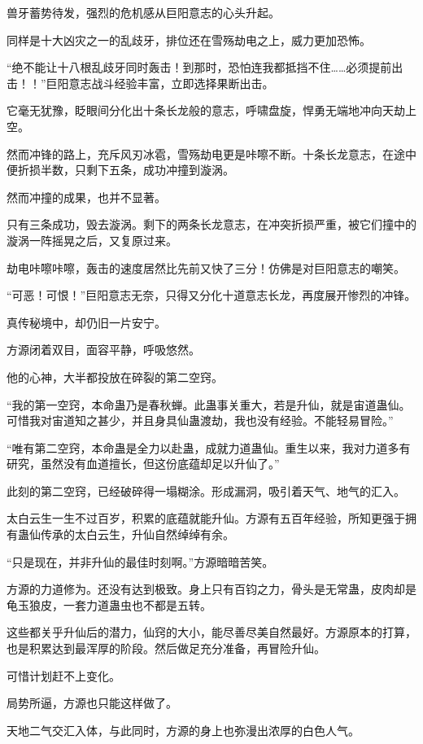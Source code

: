 \begin{this_body}
兽牙蓄势待发，强烈的危机感从巨阳意志的心头升起。

同样是十大凶灾之一的乱歧牙，排位还在雪殇劫电之上，威力更加恐怖。

“绝不能让十八根乱歧牙同时轰击！到那时，恐怕连我都抵挡不住……必须提前出击！！”巨阳意志战斗经验丰富，立即选择果断出击。

它毫无犹豫，眨眼间分化出十条长龙般的意志，呼啸盘旋，悍勇无端地冲向天劫上空。

然而冲锋的路上，充斥风刃冰雹，雪殇劫电更是咔嚓不断。十条长龙意志，在途中便折损半数，只剩下五条，成功冲撞到漩涡。

然而冲撞的成果，也并不显著。

只有三条成功，毁去漩涡。剩下的两条长龙意志，在冲突折损严重，被它们撞中的漩涡一阵摇晃之后，又复原过来。

劫电咔嚓咔嚓，轰击的速度居然比先前又快了三分！仿佛是对巨阳意志的嘲笑。

“可恶！可恨！”巨阳意志无奈，只得又分化十道意志长龙，再度展开惨烈的冲锋。

真传秘境中，却仍旧一片安宁。

方源闭着双目，面容平静，呼吸悠然。

他的心神，大半都投放在碎裂的第二空窍。

“我的第一空窍，本命蛊乃是春秋蝉。此蛊事关重大，若是升仙，就是宙道蛊仙。可惜我对宙道知之甚少，并且身具仙蛊渡劫，我也没有经验。不能轻易冒险。”

“唯有第二空窍，本命蛊是全力以赴蛊，成就力道蛊仙。重生以来，我对力道多有研究，虽然没有血道擅长，但这份底蕴却足以升仙了。”

此刻的第二空窍，已经破碎得一塌糊涂。形成漏洞，吸引着天气、地气的汇入。

太白云生一生不过百岁，积累的底蕴就能升仙。方源有五百年经验，所知更强于拥有蛊仙传承的太白云生，升仙自然绰绰有余。

“只是现在，并非升仙的最佳时刻啊。”方源暗暗苦笑。

方源的力道修为。还没有达到极致。身上只有百钧之力，骨头是无常蛊，皮肉却是龟玉狼皮，一套力道蛊虫也不都是五转。

这些都关乎升仙后的潜力，仙窍的大小，能尽善尽美自然最好。方源原本的打算，也是积累达到最浑厚的阶段。然后做足充分准备，再冒险升仙。

可惜计划赶不上变化。

局势所逼，方源也只能这样做了。

天地二气交汇入体，与此同时，方源的身上也弥漫出浓厚的白色人气。


\end{this_body}

